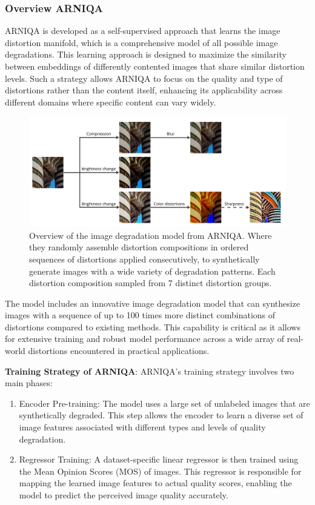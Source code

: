 \subsubsection{Overview ARNIQA}
\label{subsub:OverviewARNIQA}
ARNIQA is developed as a self-supervised approach that learns the image distortion manifold, which is a comprehensive model of all possible image degradations. This learning approach is designed to maximize the similarity between embeddings of differently contented images that share similar distortion levels. Such a strategy allows ARNIQA to focus on the quality and type of distortions rather than the content itself, enhancing its applicability across different domains where specific content can vary widely.\par
\begin{figure}[ht]
    \centering
    \includegraphics[keepaspectratio,width=15cm]{img/degradation.jpg}
    \caption{Overview of the image degradation model from ARNIQA. Where they randomly assemble distortion compositions in ordered sequences of distortions applied consecutively, to synthetically generate images with a wide variety of degradation patterns. Each distortion composition sampled from 7 distinct distortion groups.}
    \label{fig:ARNIQAdegradation}
\end{figure}
The model includes an innovative image degradation model that can synthesize images with a sequence of up to 100 times more distinct combinations of distortions compared to existing methods. This capability is critical as it allows for extensive training and robust model performance across a wide array of real-world distortions encountered in practical applications.\par
\vspace{\baselineskip}
\noindent
\textbf{Training Strategy of ARNIQA}: ARNIQA’s training strategy involves two main phases:\par
\noindent
\begin{enumerate}
    \item Encoder Pre-training: The model uses a large set of unlabeled images that are synthetically degraded. This step allows the encoder to learn a diverse set of image features associated with different types and levels of quality degradation.
    \item Regressor Training: A dataset-specific linear regressor is then trained using the Mean Opinion Scores (MOS) of images. This regressor is responsible for mapping the learned image features to actual quality scores, enabling the model to predict the perceived image quality accurately.
\end{enumerate}
